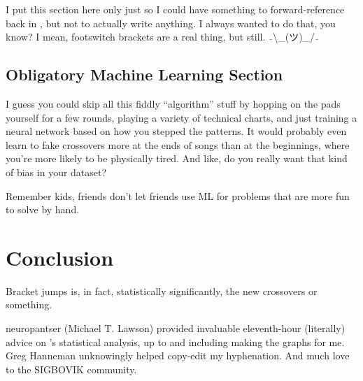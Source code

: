 \documentclass[10pt]{sigplanconf}
\begin{document}
I put this section here only just so I could have something to forward-reference back in ,
but not to actually write anything.
I always wanted to do that, you know?
I mean, footswitch brackets are %
a real thing, but still. $\bar{~~}$\textbackslash\_(ツ)\_/$\bar{~~}$

\subsection{Obligatory Machine Learning Section}

I guess you could skip all this fiddly ``algorithm'' stuff by
hopping on the pads yourself for a few rounds, playing a variety of technical charts,
and just training a neural network based on how you stepped the patterns.
It would probably even learn to fake crossovers more at the ends of songs than at the beginnings,
where you're more likely to be physically tired.
And like, do you really want that kind of bias in your dataset?

Remember kids, friends don't let friends use ML for problems that are more fun to solve by hand.

\section{Conclusion}

Bracket jumps is, in fact, statistically significantly, the new crossovers or something.

\acks

neuropantser (Michael T. Lawson) provided invaluable eleventh-hour (literally) advice
on 's statistical analysis, up to and including making the graphs for me.
Greg Hanneman unknowingly helped copy-edit my hyphenation.
And much love to the SIGBOVIK community.




\end{document}
